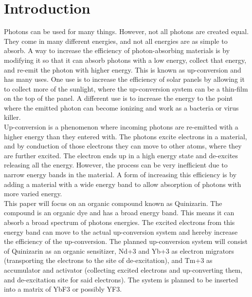 \documentclass{article}
\begin{document}

\section{Introduction}  \label{sec:Introduction}

    Photons can be used for many things. However, not all photons are created equal. They come in many different energies, and not all energies are as simple to absorb. A way to increase the efficiency of photon-absorbing materials is by modifying it so that it can absorb photons with a low energy, collect that energy, and re-emit the photon with higher energy. This is known as up-conversion and has many uses. One use is to increase the efficiency of solar panels by allowing it to collect more of the sunlight, where the up-conversion system can be a thin-film on the top of the panel. A different use is to increase the energy to the point where the emitted photon can become ionizing and work as a bacteria or virus killer.\\

    Up-conversion is a phenomenon where incoming photons are re-emitted with a higher energy than they entered with. The photons excite electrons in a material, and by conduction of those electrons they can move to other atoms, where they are further excited. The electron ends up in a high energy state and de-excites releasing all the energy. However, the process can be very inefficient due to narrow energy bands in the material. A form of increasing this efficiency is by adding a material with a wide energy band to allow absorption of photons with more varied energy.\\

    This paper will focus on an organic compound known as Quinizarin. The compound is an organic dye and has a broad energy band. This means it can absorb a broad spectrum of photons energies. The excited electrons from this energy band can move to the actual up-conversion system and hereby increase the efficiency of the up-conversion. The planned up-conversion system will consist of Quinizarin as an organic sensitizer, Nd+3 and Yb+3 as electron migrators (transporting the electrons to the site of de-excitation), and Tm+3 as accumulator and activator (collecting excited electrons and up-converting them, and de-excitation site for said electrons). The system is planned to be inserted into a matrix of YbF3 or possibly YF3.\\
\end{document}
